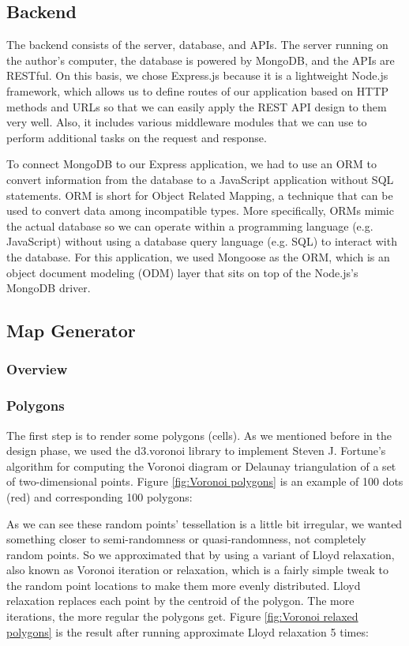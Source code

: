 \subsection{Backend}
The backend consists of the server, database, and APIs. The server running on the author's computer, the database is powered by MongoDB, and the APIs are RESTful. On this basis, we chose Express.js because it is a lightweight Node.js framework, which allows us to define routes of our application based on HTTP methods and URLs so that we can easily apply the REST API design to them very well. Also, it includes various middleware modules that we can use to perform additional tasks on the request and response.

To connect MongoDB to our Express application, we had to use an ORM to convert information from the database to a JavaScript application without SQL statements. ORM is short for Object Related Mapping, a technique that can be used to convert data among incompatible types. More specifically, ORMs mimic the actual database so we can operate within a programming language (e.g. JavaScript) without using a database query language (e.g. SQL) to interact with the database. For this application, we used Mongoose as the ORM, which is an object document modeling (ODM) layer that sits on top of the Node.js's MongoDB driver.

\subsection{Map Generator}

\subsubsection{Overview}


\subsubsection{Polygons}
The first step is to render some polygons (cells). As we mentioned before in the design phase, we used the d3.voronoi library to implement Steven J. Fortune’s algorithm for computing the Voronoi diagram or Delaunay triangulation of a set of two-dimensional points. Figure \ref{fig:Voronoi polygons} is an example of 100 dots (red) and corresponding 100 polygons:

As we can see these random points' tessellation is a little bit irregular, we wanted something closer to semi-randomness or quasi-randomness, not completely random points. So we approximated that by using a variant of Lloyd relaxation, also known as Voronoi iteration or relaxation, which is a fairly simple tweak to the random point locations to make them more evenly distributed. Lloyd relaxation replaces each point by the centroid of the polygon. The more iterations, the more regular the polygons get. Figure \ref{fig:Voronoi relaxed polygons} is the result after running approximate Lloyd relaxation 5 times:

